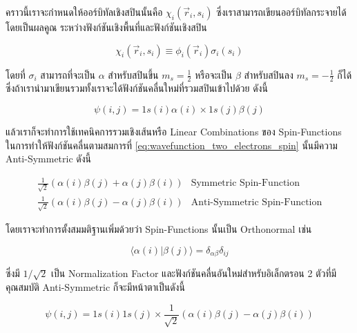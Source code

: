 คราวนี้เราจะกำหนดให้ออร์บิทัลเชิงสปินนั้นคือ $\chi_i\left(\vec{r}_i, s_i\right)$ ซึ่งเราสามารถเขียนออร์บิทัลกระจายได้โดยเป็นผลคูณ%
ระหว่างฟังก์ชันเชิงพื้นที่และฟังก์ชันเชิงสปิน

\begin{equation}
  \chi_i\left(\vec{r}_i, s_i\right)
  \equiv
  \phi_i\left(\vec{r}_i\right) \sigma_i\left(s_i\right)
\end{equation}

\noindent โดยที่ $\sigma_i$ สามารถที่จะเป็น $\alpha$ สำหรับสปินขึ้น $m_s=\frac{1}{2}$ หรือจะเป็น $\beta$ สำหรับสปินลง
$m_s=-\frac{1}{2}$ ก็ได้ ซึ่งถ้าเรานำมาเขียนรวมทั้งเราจะได้ฟังก์ชันคลื่นใหม่ที่รวมสปินเข้าไปด้วย ดังนี้

\begin{equation}
  \label{eq:wavefunction_two_electrons_spin}
  \psi(i, j)
  =
  1 s(i) \alpha(i) \times 1 s(j) \beta(j)
\end{equation}

\noindent แล้วเราก็จะทำการใช้เทคนิคการรวมเชิงเส้นหรือ Linear Combinations ของ Spin-Functions ในการทำให้ฟังก์ชันคลื่นตามสมการที่
\eqref{eq:wavefunction_two_electrons_spin} นั้นมีความ Anti-Symmetric ดังนี้

\begin{equation}
  \begin{array}{ll}
    \frac{1}{\sqrt{2}}(\alpha(i) \beta(j) + \alpha(j) \beta(i)) & \text{Symmetric Spin-Function}      \\
    \frac{1}{\sqrt{2}}(\alpha(i) \beta(j) - \alpha(j) \beta(i)) & \text{Anti-Symmetric Spin-Function}
  \end{array}
\end{equation}

\noindent โดยเราจะทำการตั้งสมมติฐานเพิ่มด้วยว่า Spin-Functions นั้นเป็น Orthonormal เช่น

\begin{equation}
  \label{eq:Spin_function_orthogonality}
  \langle\alpha(i) | \beta(j)\rangle=\delta_{\alpha \beta} \delta_{i j}
\end{equation}

\noindent ซึ่งมี $1 / \sqrt{2}$ เป็น Normalization Factor และฟังก์ชันคลื่นอันใหม่สำหรับอิเล็กตรอน 2 ตัวที่มีคุณสมบัติ Anti-Symmetric
ก็จะมีหน้าตาเป็นดังนี้

\begin{equation}
  \psi(i, j)
  =
  1 s(i) 1 s(j) \times \frac{1}{\sqrt{2}}(\alpha(i) \beta(j)-\alpha(j) \beta(i))
\end{equation}

